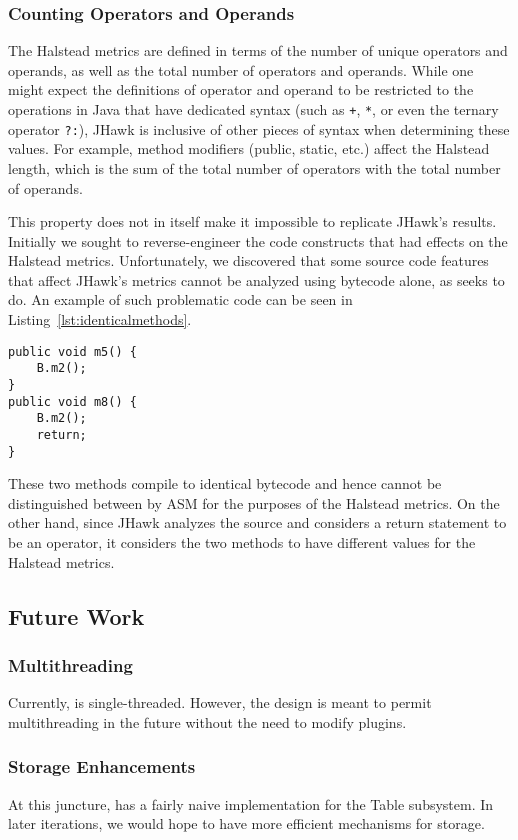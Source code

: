 \subsubsection{Counting Operators and Operands}

The Halstead metrics are defined in terms of the number of unique operators and operands, as well as the total number of operators and operands. While one might expect the definitions of operator and operand to be restricted to the operations in Java that have dedicated syntax (such as \texttt{+}, \texttt{*}, or even the ternary operator \texttt{?:}), JHawk is inclusive of other pieces of syntax when determining these values. For example, method modifiers (public, static, etc.) affect the Halstead length, which is the sum of the total number of operators with the total number of operands.

This property does not in itself make it impossible to replicate JHawk's results. Initially we sought to reverse-engineer the code constructs that had effects on the Halstead metrics. Unfortunately, we discovered that some source code features that affect JHawk's metrics cannot be analyzed using bytecode alone, as \mt{} seeks to do. An example of such problematic code can be seen in Listing~\ref{lst:identicalmethods}.

\begin{lstlisting}[frame=single,caption=Methods with identical bytecode,label=lst:identicalmethods]
public void m5() {
    B.m2();
}
public void m8() {
    B.m2();
    return;
}
\end{lstlisting}

These two methods compile to identical bytecode and hence cannot be distinguished between by ASM for the purposes of the Halstead metrics. On the other hand, since JHawk analyzes the source and considers a return statement to be an operator, it considers the two methods to have different values for the Halstead metrics.

\subsection{Future Work}

\subsubsection{Multithreading}
Currently, \mt{} is single-threaded. However, the design is meant to permit multithreading in the future without the need to modify plugins. 

\subsubsection{Storage Enhancements}
At this juncture, \mt{} has a fairly naive implementation for the Table subsystem. In later iterations, we would hope to have more efficient mechanisms for storage.
